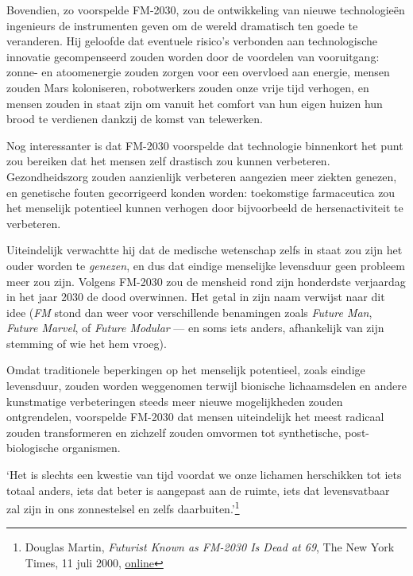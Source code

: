 \documentclass[
  a5paper,
  smalldemyvopaper,11pt,twoside,onecolumn,openright,extrafontsizes,
hidelinks]{memoir}
\renewenvironment{quote}%
               {\list{}{\rightmargin=.3cm\leftmargin=.3cm}%
                \itshape \item[]}%
               {\endlist}
\begin{document}
Bovendien, zo voorspelde FM-2030, zou de ontwikkeling van nieuwe
technologieën ingenieurs de instrumenten geven om de wereld dramatisch
ten goede te veranderen. Hij geloofde dat eventuele risico's verbonden
aan technologische innovatie gecompenseerd zouden worden door de
voordelen van vooruitgang: zonne- en atoomenergie zouden zorgen voor een
overvloed aan energie, mensen zouden Mars koloniseren, robotwerkers
zouden onze vrije tijd verhogen, en mensen zouden in staat zijn om
vanuit het comfort van hun eigen huizen hun brood te verdienen dankzij
de komst van telewerken.

Nog interessanter is dat FM-2030 voorspelde dat technologie binnenkort
het punt zou bereiken dat het mensen zelf drastisch zou kunnen
verbeteren. Gezondheidszorg zouden aanzienlijk verbeteren aangezien meer
ziekten genezen, en genetische fouten gecorrigeerd konden worden:
toekomstige farmaceutica zou het menselijk potentieel kunnen verhogen
door bijvoorbeeld de hersenactiviteit te verbeteren.

Uiteindelijk verwachtte hij dat de medische wetenschap zelfs in staat
zou zijn het ouder worden te \emph{genezen}, en dus dat eindige
menselijke levensduur geen probleem meer zou zijn. Volgens FM-2030 zou
de mensheid rond zijn honderdste verjaardag in het jaar 2030 de dood
overwinnen. Het getal in zijn naam verwijst naar dit idee (\emph{FM}
stond dan weer voor verschillende benamingen zoals \emph{Future Man},
\emph{Future Marvel}, of \emph{Future Modular} --- en soms iets anders,
afhankelijk van zijn stemming of wie het hem vroeg).

Omdat traditionele beperkingen op het menselijk potentieel, zoals
eindige levensduur, zouden worden weggenomen terwijl bionische
lichaamsdelen en andere kunstmatige verbeteringen steeds meer nieuwe
mogelijkheden zouden ontgrendelen, voorspelde FM-2030 dat mensen
uiteindelijk het meest radicaal zouden transformeren en zichzelf zouden
omvormen tot synthetische, post-biologische organismen.

\begin{quote}
`Het is slechts een kwestie van tijd voordat we onze lichamen
herschikken tot iets totaal anders, iets dat beter is aangepast aan de
ruimte, iets dat levensvatbaar zal zijn in ons zonnestelsel en zelfs
daarbuiten.'\footnote{Douglas Martin, \emph{Futurist Known as FM-2030 Is
  Dead at 69}, The New York Times, 11 juli 2000,
  \href{https://www.nytimes.com/2000/07/11/us/futurist-known-as-fm-2030-is-dead-at-69.html}{online}}
\end{quote}
\end{document}
